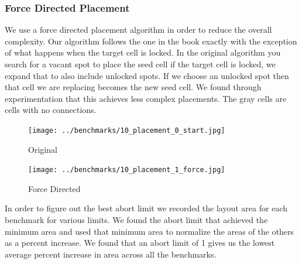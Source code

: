 \documentclass[10pt]{article}
\begin{document}
        \newpage
        \subsubsection{Force Directed Placement}

        We use a force directed placement algorithm in order to reduce the
        overall complexity. Our algorithm follows the one in the book exactly
        with the exception of what happens when the target cell is locked. In
        the original algorithm you search for a vacant spot to place the seed
        cell if the target cell is locked, we expand that to also include
        unlocked spots. If we choose an unlocked spot then that cell we are
        replacing becomes the new seed cell.  We found through experimentation
        that this achieves less complex placements. The gray cells are cells
        with no connections.

        \begin{figure}[H]
            \centering
            \texttt{[image: ../benchmarks/10\_placement\_0\_start.jpg]}
            \caption{Original}
        \end{figure}
        \begin{figure}[H]
            \centering
            \texttt{[image: ../benchmarks/10\_placement\_1\_force.jpg]}
            \caption{Force Directed}
        \end{figure}

        In order to figure out the best abort limit we recorded the layout area
        for each benchmark for various limits. We found the abort limit that
        achieved the minimum area and used that minimum area to normalize the
        areas of the others as a percent increase. We found that an abort limit
        of 1 gives us the lowest average percent increase in area across all
        the benchmarks.
\end{document}
